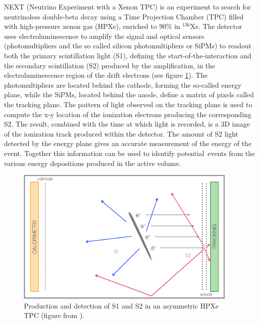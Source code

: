 \documentclass[a4paper,11pt]{article}
\begin{document}
NEXT (Neutrino Experiment with a Xenon TPC) \cite{Gomez-Cadenas:2014dxa} is an experiment to search for neutrinoless double-beta decay using a Time Projection Chamber (TPC) filled with 
high-pressure xenon gas (HPXe), enriched to 90\% in  $^{136}$Xe.  The detector uses electroluminescence to amplify the signal and optical sensors (photomultipliers and the so called silicon photomultipliers or SiPMs) to readout both the primary scintillation light (S1), defining the start-of-the-interaction and the secondary scintillation (S2) produced by the amplification, in the electroluminescence region of the drift electrons (see figure \ref{fig.SS}). The photomultipliers are located behind the cathode, forming the so-called energy plane, while the SiPMs, located behind the anode, define a matrix of pixels called the tracking plane. 
The pattern of light observed on the tracking plane is used to compute the x-y location of the ionization electrons producing the corresponding S2.  The result, combined with the time at which light is recorded, is a 3D image of the ionization track produced within the 
detector.  The amount of S2 light detected by the energy plane gives an accurate measurement of the energy of the event.  Together this information can be used to identify potential 
\bbonu\,events from the various energy depositions produced in the active volume.

\begin{figure}[!htb]
	\centering
	\includegraphics[width= 0.95\textwidth]{fig/SoftAsymmetric_bound.pdf}
	\caption{Production and detection of S1 and S2 in an asymmetric HPXe TPC (figure from \cite{MartinAlbo_thesis}).} \label{fig.SS}
\end{figure}
\end{document}
